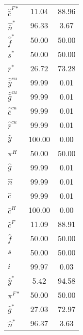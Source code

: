 \begin{center}
\begin{longtable}{lcc}
${\hat {\bar c}^{F*}}  $	 & 	             11.04	 & 	             88.96 \\ 
${\hat {\bar n}^*}     $	 & 	             96.33	 & 	              3.67 \\ 
${\hat {\bar f}^*}     $	 & 	             50.00	 & 	             50.00 \\ 
${\bar s^*}            $	 & 	             50.00	 & 	             50.00 \\ 
${\bar r^*}            $	 & 	             26.72	 & 	             73.28 \\ 
${\hat {\bar y}^{cu}}  $	 & 	             99.99	 & 	              0.01 \\ 
${\hat {\bar g}^{cu}}  $	 & 	             99.99	 & 	              0.01 \\ 
${\hat {\bar c}^{cu}}  $	 & 	             99.99	 & 	              0.01 \\ 
${\hat {\bar r}^{cu}}  $	 & 	             99.99	 & 	              0.01 \\ 
${\hat y}              $	 & 	            100.00	 & 	              0.00 \\ 
${\pi^H}               $	 & 	             50.00	 & 	             50.00 \\ 
${\hat g}              $	 & 	             99.99	 & 	              0.01 \\ 
${\hat n}              $	 & 	             99.99	 & 	              0.01 \\ 
${\hat c}              $	 & 	             99.99	 & 	              0.01 \\ 
${\hat c^H}            $	 & 	            100.00	 & 	              0.00 \\ 
${\hat c^F}            $	 & 	             11.09	 & 	             88.91 \\ 
${\hat f}              $	 & 	             50.00	 & 	             50.00 \\ 
${s}                   $	 & 	             50.00	 & 	             50.00 \\ 
${i}                   $	 & 	             99.97	 & 	              0.03 \\ 
${\hat y^*}            $	 & 	              5.42	 & 	             94.58 \\ 
${\pi^{F*}}            $	 & 	             50.00	 & 	             50.00 \\ 
${\hat g^*}            $	 & 	             27.03	 & 	             72.97 \\ 
${\hat n^*}            $	 & 	             96.37	 & 	              3.63 \\ 

\end{longtable}
\end{center}
